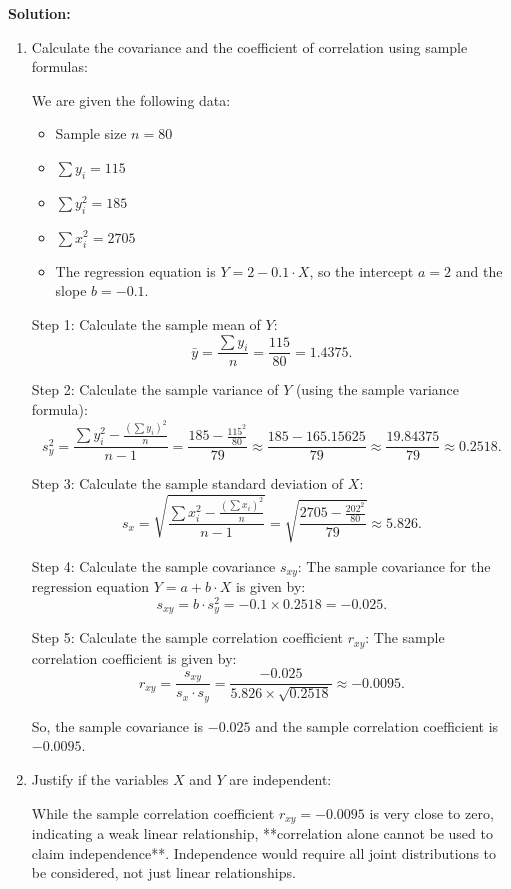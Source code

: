 \documentclass[12pt]{article}
\begin{document}
\begin{enumerate}
{\color{blue}
\noindent \textbf{Solution:}

\begin{enumerate}
\item Calculate the covariance and the coefficient of correlation using sample formulas:

We are given the following data:

\begin{itemize}
    \item Sample size \( n = 80 \)
    \item \( \sum y_i = 115 \)
    \item \( \sum y_i^2 = 185 \)
    \item \( \sum x_i^2 = 2705 \)
    \item The regression equation is \( Y = 2 - 0.1 \cdot X \), so the intercept \( a = 2 \) and the slope \( b = -0.1 \).
\end{itemize}

Step 1: Calculate the sample mean of \( Y \):
\[
\bar{y} = \frac{\sum y_i}{n} = \frac{115}{80} = 1.4375.
\]

Step 2: Calculate the sample variance of \( Y \) (using the sample variance formula):
\[
s_y^2 = \frac{\sum y_i^2 - \frac{(\sum y_i)^2}{n}}{n - 1} = \frac{185 - \frac{115^2}{80}}{79} \approx \frac{185 - 165.15625}{79} \approx \frac{19.84375}{79} \approx 0.2518.
\]

Step 3: Calculate the sample standard deviation of \( X \):
\[
s_x = \sqrt{\frac{\sum x_i^2 - \frac{(\sum x_i)^2}{n}}{n - 1}} = \sqrt{\frac{2705 - \frac{202^2}{80}}{79}} \approx 5.826.
\]

Step 4: Calculate the sample covariance \( s_{xy} \):
The sample covariance for the regression equation \( Y = a + b \cdot X \) is given by:
\[
s_{xy} = b \cdot s_y^2 = -0.1 \times 0.2518 = -0.025.
\]

Step 5: Calculate the sample correlation coefficient \( r_{xy} \):
The sample correlation coefficient is given by:
\[
r_{xy} = \frac{s_{xy}}{s_x \cdot s_y} = \frac{-0.025}{5.826 \times \sqrt{0.2518}} \approx -0.0095.
\]

So, the sample covariance is \( -0.025 \) and the sample correlation coefficient is \( -0.0095 \).

\item Justify if the variables \( X \) and \( Y \) are independent:

While the sample correlation coefficient \( r_{xy} = -0.0095 \) is very close to zero, indicating a weak linear relationship, **correlation alone cannot be used to claim independence**. Independence would require all joint distributions to be considered, not just linear relationships.


\end{enumerate}}
\end{enumerate}
\end{document}
